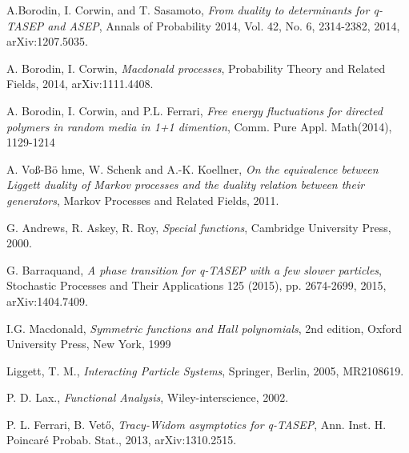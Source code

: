 \begin{singlespace}



\begin{thebibliography}{9}

  A.Borodin, I. Corwin, and T. Sasamoto,
  \emph{From duality to determinants for q-TASEP and ASEP},
  Annals of Probability 2014,
  Vol. 42, No. 6, 2314-2382,
  2014,
  arXiv:1207.5035.

  A. Borodin, I. Corwin,
  \emph{Macdonald processes},
  Probability Theory and Related Fields,
  2014,
  arXiv:1111.4408.

  A. Borodin, I. Corwin, and P.L. Ferrari,
  \emph{Free energy fluctuations for directed polymers in random media in 1+1 dimention},
  Comm. Pure Appl. Math(2014),
  1129-1214

  A. Vo\ss -B\"o hme, W. Schenk and A.-K. Koellner,
  \emph{On the equivalence between Liggett duality of Markov processes and the duality relation between their generators},
  Markov Processes and Related Fields,
  2011.

  G. Andrews, R. Askey, R. Roy,
  \emph{Special functions},
  Cambridge University Press,
  2000.

  G. Barraquand,
  \emph{A phase transition for q-TASEP with a few slower particles},
  Stochastic Processes and Their Applications 125 (2015),
  pp. 2674-2699,
  2015,
  arXiv:1404.7409.

  I.G. Macdonald,
  \emph{Symmetric functions and Hall polynomials},
  2nd edition, 
  Oxford University Press,
  New York,
  1999

  Liggett, T. M.,
  \emph{Interacting Particle Systems},
  Springer,
  Berlin,
  2005,
  MR2108619.

  P. D. Lax.,
  \emph{Functional Analysis},
  Wiley-interscience,
  2002.

  P. L. Ferrari, B. Vet\H o,
  \emph{Tracy-Widom asymptotics for q-TASEP},
  Ann. Inst. H. Poincar\' e Probab. Stat.,
  2013,
  arXiv:1310.2515.

\end{thebibliography}

\end{singlespace}
